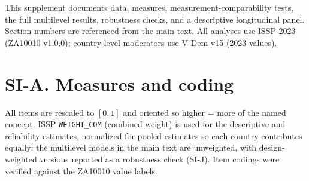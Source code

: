 {\singlespacing\noindent This supplement documents data, measures, measurement-comparability tests, the full multilevel results, robustness checks, and a descriptive longitudinal panel. Section numbers are referenced from the main text. All analyses use ISSP 2023 (ZA10010 v1.0.0); country-level moderators use V-Dem v15 (2023 values).\par}

\clearpage
\section{SI-A. Measures and coding}\label{si-a.-measures-and-coding}

All items are rescaled to \([0,1]\) and oriented so higher = more of the named concept. ISSP \texttt{WEIGHT\_COM} (combined weight) is used for the descriptive and reliability estimates, normalized for pooled estimates so each country contributes equally; the multilevel models in the main text are unweighted, with design-weighted versions reported as a robustness check (SI-J). Item codings were verified against the ZA10010 value labels.

